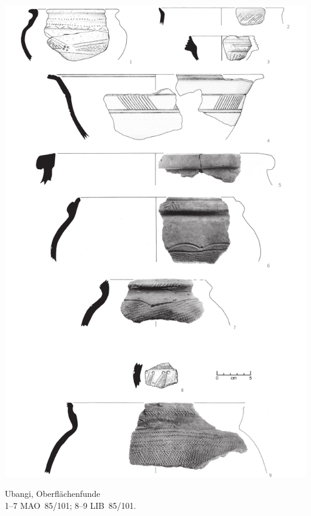 \begin{pl}[H]
	\includegraphics{plt/Taf15.pdf}
	\vspace{.75em}\caption{\mbox{Ubangi}, Oberflächenfunde \\ 1--7 MAO~85/101; 8--9 LIB~85/101.}
	\label{pl:15}
\end{pl}


